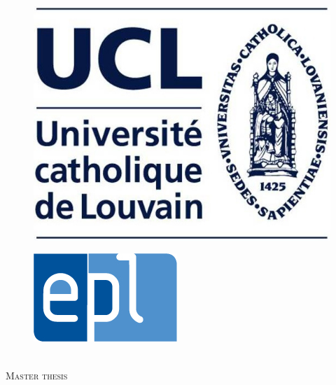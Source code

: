 \documentclass[11pt, a4paper, twoside, openright]{Packages/Thesis}
\begin{document}
\begin{titlepage}
\begin{center}

\textsc{\LARGE \univname}\\[0.1cm] %
\textsc{\large \facname\\\deptname}\\[1cm] %

\begin{minipage}{\linewidth}
	\centering
	\begin{minipage}{0.45\linewidth}
		\begin{figure}[H]
			\includegraphics[width=.4\linewidth, left]{Pictures/UCL/ucl.jpg}
		\end{figure}
	\end{minipage}
	\hspace{0.05\linewidth}
	\begin{minipage}{0.45\linewidth}
		\begin{figure}[H]
			\includegraphics[width=.5\linewidth, right]{Pictures/UCL/epl.jpg}
		\end{figure}
	\end{minipage}
\end{minipage}\\[1cm]

\textsc{\Large Master thesis}\\[1cm] %

\HRule \\[0.4cm] %
{\huge \bfseries \ttitle}\\[0.4cm] %
\HRule \\[1.5cm] %
 

\end{center}
\end{titlepage}
\end{document}
